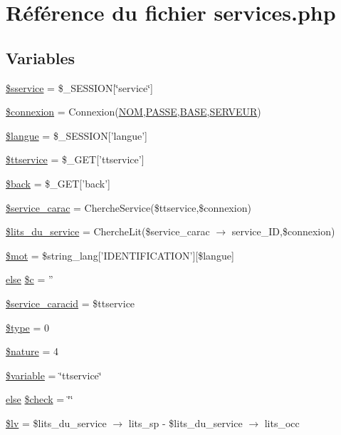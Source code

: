\hypertarget{services_8php}{
\section{R\'{e}f\'{e}rence du fichier services.php}
\label{services_8php}
}
\subsection*{Variables}
\begin{CompactItemize}
\item 
\hyperlink{services_8php_a0}{\$sservice} = \$\_\-SESSION\mbox{[}\char`\"{}service\char`\"{}\mbox{]}
\item 
\hyperlink{services_8php_a1}{\$connexion} = Connexion(\hyperlink{pma__connect_8php_a0}{NOM},\hyperlink{pma__connect_8php_a1}{PASSE},\hyperlink{pma__connect_8php_a3}{BASE},\hyperlink{pma__connect_8php_a2}{SERVEUR})
\item 
\hyperlink{services_8php_a2}{\$langue} = \$\_\-SESSION\mbox{[}'langue'\mbox{]}
\item 
\hyperlink{services_8php_a3}{\$ttservice} = \$\_\-GET\mbox{[}'ttservice'\mbox{]}
\item 
\hyperlink{services_8php_a4}{\$back} = \$\_\-GET\mbox{[}'back'\mbox{]}
\item 
\hyperlink{services_8php_a5}{\$service\_\-carac} = Cherche\-Service(\$ttservice,\$connexion)
\item 
\hyperlink{services_8php_a6}{\$lits\_\-du\_\-service} = Cherche\-Lit(\$service\_\-carac $\rightarrow$ service\_\-ID,\$connexion)
\item 
\hyperlink{services_8php_a7}{\$mot} = \$string\_\-lang\mbox{[}'IDENTIFICATION'\mbox{]}\mbox{[}\$langue\mbox{]}
\item 
\hyperlink{cron_8php_a9}{else} \hyperlink{services_8php_a8}{\$c} = ''
\item 
\hyperlink{services_8php_a9}{\$service\_\-caracid} = \$ttservice
\item 
\hyperlink{services_8php_a10}{\$type} = 0
\item 
\hyperlink{services_8php_a11}{\$nature} = 4
\item 
\hyperlink{services_8php_a12}{\$variable} = \char`\"{}ttservice\char`\"{}
\item 
\hyperlink{cron_8php_a9}{else} \hyperlink{services_8php_a13}{\$check} = \char`\"{}\char`\"{}
\item 
\hyperlink{services_8php_a14}{\$lv} = \$lits\_\-du\_\-service $\rightarrow$ lits\_\-sp - \$lits\_\-du\_\-service $\rightarrow$ lits\_\-occ
\end{CompactItemize}



